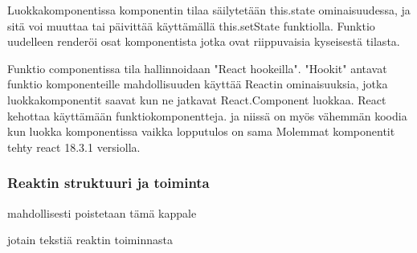 

Luokkakomponentissa komponentin tilaa säilytetään this.state ominaisuudessa, ja sitä voi muuttaa tai päivittää käyttämällä this.setState funktiolla. 
Funktio uudelleen renderöi osat komponentista jotka ovat riippuvaisia kyseisestä tilasta.
\medskip


Funktio componentissa tila hallinnoidaan "React hookeilla"{}. 
"Hookit"{} antavat funktio komponenteille mahdollisuuden käyttää Reactin ominaisuuksia, 
jotka luokkakomponentit saavat kun ne jatkavat React.Component luokkaa.
%
React kehottaa käyttämään funktiokomponentteja. 
ja niissä on myös vähemmän koodia kun luokka komponentissa vaikka lopputulos on sama
Molemmat komponentit tehty react 18.3.1 versiolla.







\medskip

\iffalse
\subsubsection{Reaktin struktuuri ja toiminta}
mahdollisesti poistetaan  tämä kappale





jotain tekstiä reaktin toiminnasta 
\bigskip



